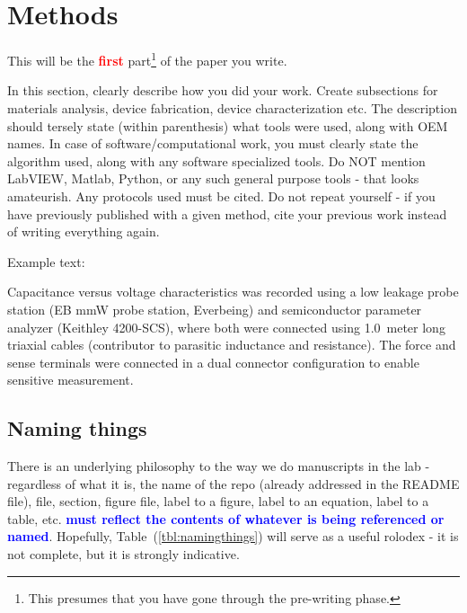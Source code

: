 \documentclass[12 pt]{article}
\begin{document}
\section{Methods}
This will be the \textbf{\Huge \textcolor{red}{first}} part\footnote{This presumes that you have gone through the pre-writing phase.} of the paper you write.

In this section, clearly describe how you did your work. Create subsections for materials analysis, device fabrication, device characterization etc. The description should tersely state (within parenthesis) what tools were used, along with OEM names. In case of software/computational work, you must clearly state the algorithm used, along with any software specialized tools. Do NOT mention LabVIEW, Matlab, Python, or any such general purpose tools - that looks amateurish. Any protocols used must be cited. Do not repeat yourself - if you have previously published with a given method, cite your previous work instead of writing everything again.

Example text:

Capacitance versus voltage characteristics was recorded using a low leakage probe station (EB mmW probe station, Everbeing) and semiconductor parameter analyzer (Keithley 4200-SCS), where both were connected using \SI{1.0}{meter} long triaxial cables (contributor to parasitic inductance and resistance). The force and sense terminals were connected in a dual connector configuration to enable sensitive measurement.

\subsection{Naming things}

There is an underlying philosophy to the way we do manuscripts in the lab - regardless of what it is, the name of the repo (already addressed in the README file), file, section, figure file, label to a figure, label to an equation, label to a table, etc. \textbf{\Huge \textcolor{blue}{must reflect the contents of whatever is being referenced or named}}. Hopefully, Table~(\ref{tbl:namingthings}) will serve as a useful rolodex - it is not complete, but it is strongly indicative.
\end{document}
